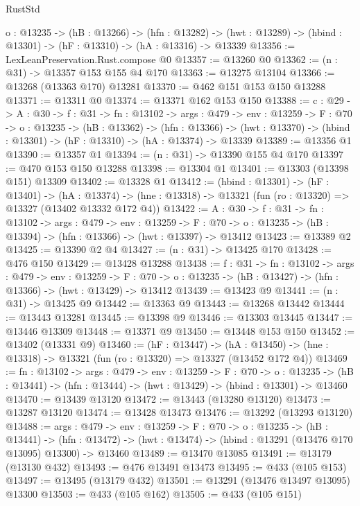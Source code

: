 \begin{lexlean}{RustStd}
\begin{coremodule}
  {o : @13235} ->
  (hB : @13266) ->
  (hfn : @13282) -> (hwt : @13289) -> (hbind : @13301) -> (hF : @13310) -> (hA : @13316) -> @13339
@13356 := LexLeanPreservation.Rust.compose @0
@13357 := @13260 @0
@13362 := (n : @31) -> @13357 @153 @155 @4 @170
@13363 := @13275 @13104
@13366 := @13268 (@13363 @170) @13281
@13370 := @462 @151 @153 @150 @13288
@13371 := @13311 @0
@13374 := @13371 @162 @153 @150
@13388 := {c : @29} ->
  {A : @30} ->
  {f : @31} ->
  {fn : @13102} ->
  {args : @479} ->
  {env : @13259} ->
  {F : @70} ->
  {o : @13235} ->
  (hB : @13362) ->
  (hfn : @13366) -> (hwt : @13370) -> (hbind : @13301) -> (hF : @13310) -> (hA : @13374) -> @13339
@13389 := @13356 @1
@13390 := @13357 @1
@13394 := (n : @31) -> @13390 @155 @4 @170
@13397 := @470 @153 @150 @13288
@13398 := @13304 @1
@13401 := @13303 (@13398 @151) @13309
@13402 := @13328 @1
@13412 := (hbind : @13301) ->
  (hF : @13401) ->
  (hA : @13374) -> (hne : @13318) -> @13321 (fun (ro : @13320) => @13327 (@13402 @13332 @172 @4))
@13422 := {A : @30} ->
  {f : @31} ->
  {fn : @13102} ->
  {args : @479} ->
  {env : @13259} ->
  {F : @70} -> {o : @13235} -> (hB : @13394) -> (hfn : @13366) -> (hwt : @13397) -> @13412
@13423 := @13389 @2
@13425 := @13390 @2 @4
@13427 := (n : @31) -> @13425 @170
@13428 := @476 @150
@13429 := @13428 @13288
@13438 := {f : @31} ->
  {fn : @13102} ->
  {args : @479} ->
  {env : @13259} ->
  {F : @70} -> {o : @13235} -> (hB : @13427) -> (hfn : @13366) -> (hwt : @13429) -> @13412
@13439 := @13423 @9
@13441 := (n : @31) -> @13425 @9
@13442 := @13363 @9
@13443 := @13268 @13442
@13444 := @13443 @13281
@13445 := @13398 @9
@13446 := @13303 @13445
@13447 := @13446 @13309
@13448 := @13371 @9
@13450 := @13448 @153 @150
@13452 := @13402 (@13331 @9)
@13460 := (hF : @13447) ->
  (hA : @13450) -> (hne : @13318) -> @13321 (fun (ro : @13320) => @13327 (@13452 @172 @4))
@13469 := {fn : @13102} ->
  {args : @479} ->
  {env : @13259} ->
  {F : @70} ->
  {o : @13235} -> (hB : @13441) -> (hfn : @13444) -> (hwt : @13429) -> (hbind : @13301) -> @13460
@13470 := @13439 @13120
@13472 := @13443 (@13280 @13120)
@13473 := @13287 @13120
@13474 := @13428 @13473
@13476 := @13292 (@13293 @13120)
@13488 := {args : @479} ->
  {env : @13259} ->
  {F : @70} ->
  {o : @13235} ->
  (hB : @13441) ->
  (hfn : @13472) -> (hwt : @13474) -> (hbind : @13291 (@13476 @170 @13095) @13300) -> @13460
@13489 := @13470 @13085
@13491 := @13179 (@13130 @432)
@13493 := @476 @13491 @13473
@13495 := @433 (@105 @153)
@13497 := @13495 (@13179 @432)
@13501 := @13291 (@13476 @13497 @13095) @13300
@13503 := @433 (@105 @162)
@13505 := @433 (@105 @151)

\end{coremodule}
\end{lexlean}
